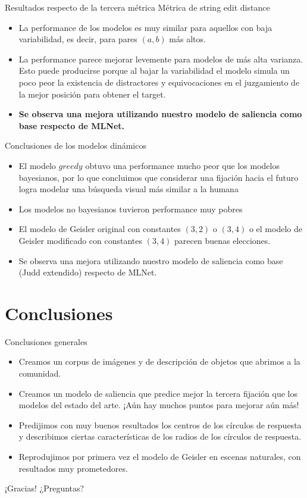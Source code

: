 \documentclass[compress]{beamer}
\begin{document}
\begin{frame}{Resultados respecto de la tercera métrica}
{Métrica de string edit distance}
\begin{itemize}
\item La performance de los modelos es muy similar para aquellos con baja variabilidad, es decir, para pares $(a, b)$ más altos. \item La performance parece mejorar levemente para modelos de más alta varianza. Esto puede producirse porque al bajar la variabilidad el modelo simula un poco peor la existencia
de distractores y equivocaciones en el juzgamiento de la mejor posición para obtener el target.
\item \textbf{Se observa una mejora utilizando nuestro modelo de saliencia como base respecto de MLNet.}
\end{itemize}
\end{frame}

\begin{frame}{Conclusiones de los modelos dinámicos}
\begin{itemize}
\item El modelo $greedy$ obtuvo una performance mucho peor que los modelos bayesianos, por lo que concluimos que considerar una fijación hacia el futuro logra modelar una búsqueda visual más similar a la humana
\item Los modelos no bayesianos tuvieron performance muy pobres
\item El modelo de Geisler original con constantes $(3,2)$ o $(3,4)$ o el modelo de Geisler modificado con constantes $(3,4)$ parecen buenas elecciones.
\item Se observa una mejora utilizando nuestro modelo de saliencia como base (Judd extendido) respecto de MLNet.
\end{itemize}
\end{frame}

\section{Conclusiones}
\begin{frame}{Conclusiones generales}
\begin{itemize}
\item Creamos un corpus de imágenes y de descripción de objetos que abrimos a la comunidad.
\item Creamos un modelo de saliencia que predice mejor la tercera fijación que los modelos del estado del arte. ¡Aún hay muchos puntos para mejorar aún más!
\item Predijimos con muy buenos resultados los centros de los círculos de respuesta y describimos ciertas características de los radios de los círculos de respuesta.
\item Reprodujimos por primera vez el modelo de Geisler en escenas naturales, con resultados muy prometedores.
\end{itemize}
\end{frame}

\begin{frame}
\Huge ¡Gracias!
\huge ¿Preguntas?

\end{frame}
\end{document}
